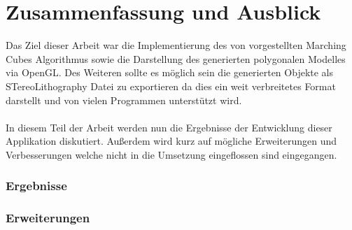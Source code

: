 \chapter{Zusammenfassung und Ausblick}
Das Ziel dieser Arbeit war die Implementierung des von \citep{MCAlgo} vorgestellten Marching Cubes Algorithmus sowie die Darstellung des generierten polygonalen Modelles via OpenGL. Des Weiteren sollte es möglich sein die generierten Objekte als STereoLithography Datei zu exportieren da dies ein weit verbreitetes Format darstellt und von vielen Programmen unterstützt wird.\\
\\
In diesem Teil der Arbeit werden nun die Ergebnisse der Entwicklung dieser Applikation diskutiert. Außerdem wird kurz auf mögliche Erweiterungen und Verbesserungen welche nicht in die Umsetzung eingeflossen sind eingegangen.

\subsection{Ergebnisse}

\subsection{Erweiterungen}